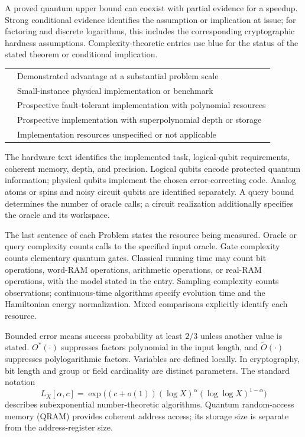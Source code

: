 \documentclass[11pt,a4paper]{article}
\newcommand{\colorcell}[1]{%
  \begin{tikzpicture}[baseline=-2pt,x=22pt,y=11pt]
    \fill[#1] (0,0) rectangle (1,1);
    \draw[black,line width=0.35pt] (0,0) rectangle (1,1);
  \end{tikzpicture}%
}
\theoremstyle{problemstyle}
\newcommand{\subhead}[1]{\Needspace{4\baselineskip}\par\vspace{5pt}{\bfseries #1\par}\vspace{1pt}}
\begin{document}
A proved quantum upper bound can coexist with partial evidence for a speedup. Strong conditional evidence identifies the assumption or implication at issue; for factoring and discrete logarithms, this includes the corresponding cryptographic hardness assumptions. Complexity-theoretic entries use blue for the status of the stated theorem or conditional implication.

\subhead{Hardware}
\begin{tabular}{@{}ll@{}}
\colorcell{hardwareDemonstrated} & Demonstrated advantage at a substantial problem scale\\[3pt]
\colorcell{hardwareSmall} & Small-instance physical implementation or benchmark\\[3pt]
\colorcell{hardwarePolynomial} & Prospective fault-tolerant implementation with polynomial resources\\[3pt]
\colorcell{hardwareExponential} & Prospective implementation with superpolynomial depth or storage\\[3pt]
\colorcell{white} & Implementation resources unspecified or not applicable
\end{tabular}

The hardware text identifies the implemented task, logical-qubit requirements, coherent memory, depth, and precision. Logical qubits encode protected quantum information; physical qubits implement the chosen error-correcting code. Analog atoms or spins and noisy circuit qubits are identified separately. A query bound determines the number of oracle calls; a circuit realization additionally specifies the oracle and its workspace.

\subhead{Complexity conventions}
The last sentence of each Problem states the resource being measured. Oracle or query complexity counts calls to the specified input oracle. Gate complexity counts elementary quantum gates. Classical running time may count bit operations, word-RAM operations, arithmetic operations, or real-RAM operations, with the model stated in the entry. Sampling complexity counts observations; continuous-time algorithms specify evolution time and the Hamiltonian energy normalization. Mixed comparisons explicitly identify each resource.

Bounded error means success probability at least $2/3$ unless another value is stated. $O^*(\cdot)$ suppresses factors polynomial in the input length, and $\widetilde O(\cdot)$ suppresses polylogarithmic factors. Variables are defined locally. In cryptography, bit length and group or field cardinality are distinct parameters. The standard notation
\[
L_X[\alpha,c]=\exp\!\big((c+o(1))(\log X)^\alpha(\log\log X)^{1-\alpha}\big)
\]
describes subexponential number-theoretic algorithms. Quantum random-access memory (QRAM) provides coherent address access; its storage size is separate from the address-register size.
\end{document}
